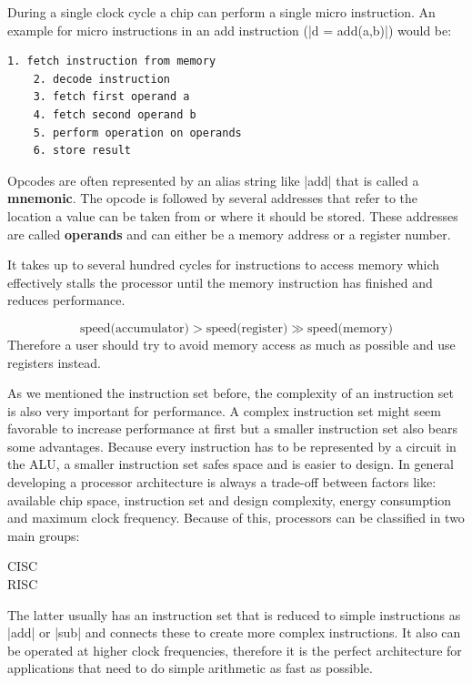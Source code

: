 During a single clock cycle a chip can perform a single micro instruction.
An example for micro instructions in an add instruction (|d = add(a,b)|) would be:
\begin{lstlisting}[caption=example of micro instructions, label=lst:microinstruction]
    1. fetch instruction from memory
    2. decode instruction
    3. fetch first operand a
    4. fetch second operand b
    5. perform operation on operands
    6. store result
\end{lstlisting}

Opcodes are often represented by an alias string like |add| that is called a \textbf{mnemonic}.
The opcode is followed by several addresses that refer to the location a value can be taken from or where it should be stored.
These addresses are called \textbf{operands} and can either be a memory address or a register number.

It takes up to several hundred cycles for instructions to access memory which effectively stalls the processor until the memory instruction has finished and reduces performance.

\begin{equation*}
    \text{speed(accumulator)} > \text{speed(register)} \gg \text{speed(memory)}
\end{equation*}
Therefore a user should try to avoid memory access as much as possible and use registers instead.

As we mentioned the instruction set before, the complexity of an instruction set is also very important for performance. 
A complex instruction set might seem favorable to increase performance at first but a smaller instruction set also bears some advantages.
Because every instruction has to be represented by a circuit in the \ac{ALU}, a smaller instruction set safes space and is easier to design.
In general developing a processor architecture is always a trade-off between factors like: available chip space, instruction set and design complexity, energy consumption and maximum clock frequency.
Because of this, processors can be classified in two main groups:
\begin{description}
    \item[\ac{CISC}]
    \item[\ac{RISC}]
\end{description}
The latter usually has an instruction set that is reduced to simple instructions as |add| or |sub| and connects these to create more complex instructions.
It also can be operated at higher clock frequencies, therefore it is the perfect architecture for applications that need to do simple arithmetic as fast as possible.

